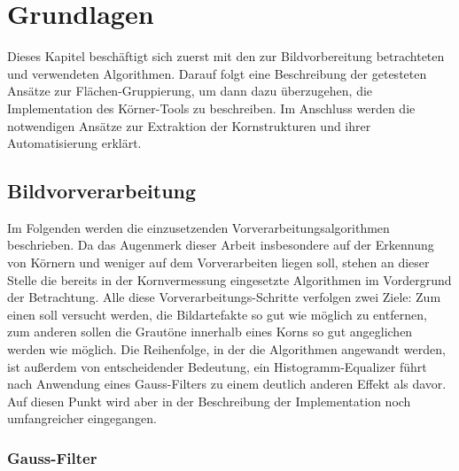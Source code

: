 \documentclass[
  12pt,
  openany]{book}
\begin{document}
\hypertarget{grundlagen}{%
\chapter{Grundlagen}\label{grundlagen}}

Dieses Kapitel beschäftigt sich zuerst mit den zur Bildvorbereitung betrachteten und verwendeten Algorithmen. Darauf folgt eine Beschreibung der getesteten Ansätze zur Flächen-Gruppierung, um dann dazu überzugehen, die Implementation des Körner-Tools zu beschreiben.
Im Anschluss werden die notwendigen Ansätze zur Extraktion der Kornstrukturen und ihrer Automatisierung erklärt.

\hypertarget{bildvorverarbeitung}{%
\section{Bildvorverarbeitung}\label{bildvorverarbeitung}}

Im Folgenden werden die einzusetzenden Vorverarbeitungsalgorithmen beschrieben. Da das Augenmerk dieser Arbeit insbesondere auf der Erkennung von Körnern und weniger auf dem Vorverarbeiten liegen soll, stehen an dieser Stelle die bereits in der Kornvermessung eingesetzte Algorithmen im Vordergrund der Betrachtung.
Alle diese Vorverarbeitungs-Schritte verfolgen zwei Ziele:
Zum einen soll versucht werden, die Bildartefakte so gut wie möglich zu entfernen, zum anderen sollen die Grautöne innerhalb eines Korns so gut angeglichen werden wie möglich.
Die Reihenfolge, in der die Algorithmen angewandt werden, ist außerdem von entscheidender Bedeutung, ein Histogramm-Equalizer führt nach Anwendung eines Gauss-Filters zu einem deutlich anderen Effekt als davor. Auf diesen Punkt wird aber in der Beschreibung der Implementation noch umfangreicher eingegangen.

\hypertarget{gauss-filter}{%
\subsection{Gauss-Filter}\label{gauss-filter}}
\end{document}
